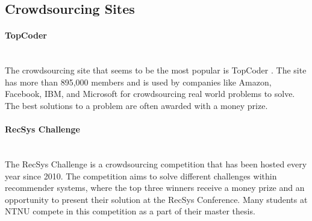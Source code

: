 \subsection{Crowdsourcing Sites}
\paragraph*{TopCoder} \hfill \\
The crowdsourcing site that seems to be the most popular is TopCoder \cite{TOPCODER}. The site has more than 895,000 members and is used by companies like Amazon, Facebook, IBM, and Microsoft for crowdsourcing real world problems to solve. The best solutions to a problem are often awarded with a money prize.

\paragraph*{RecSys Challenge} \hfill \\
The RecSys Challenge \cite{RECSYS} is a crowdsourcing competition that has been hosted every year since 2010. The competition aims to solve different challenges within recommender systems, where the top three winners receive a money prize and an opportunity to present their solution at the RecSys Conference. Many students at NTNU compete in this competition as a part of their master thesis.


